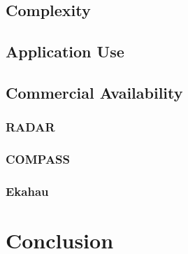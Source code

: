 \subsection{Complexity}
\subsection{Application Use}
\subsection{Commercial Availability}
\subsubsection{RADAR}
\subsubsection{COMPASS}
\subsubsection{Ekahau}
\section{Conclusion}
